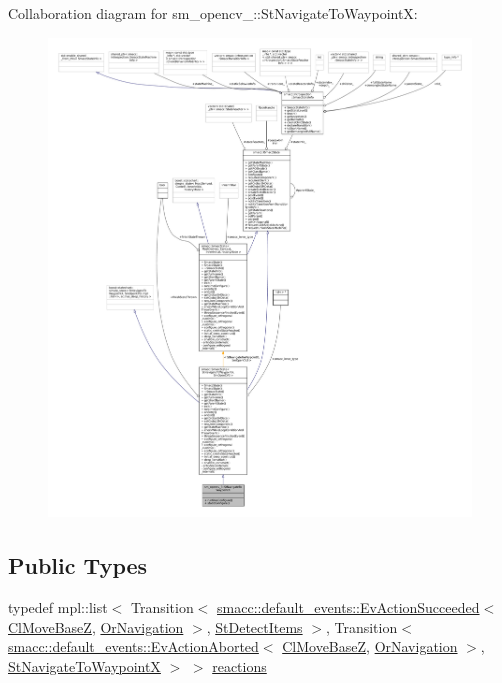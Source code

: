 Collaboration diagram for sm\+\_\+opencv\+\_\+:\+:St\+Navigate\+To\+WaypointX\+:
\nopagebreak
\begin{figure}[H]
\begin{center}
\leavevmode
\includegraphics[width=350pt]{structsm__opencv__3_1_1StNavigateToWaypointX__coll__graph}
\end{center}
\end{figure}
\subsection*{Public Types}
\begin{DoxyCompactItemize}
\item 
typedef mpl\+::list$<$ Transition$<$ \hyperlink{structsmacc_1_1default__events_1_1EvActionSucceeded}{smacc\+::default\+\_\+events\+::\+Ev\+Action\+Succeeded}$<$ \hyperlink{classcl__move__base__z_1_1ClMoveBaseZ}{Cl\+Move\+BaseZ}, \hyperlink{classsm__opencv__3_1_1OrNavigation}{Or\+Navigation} $>$, \hyperlink{structsm__opencv__3_1_1StDetectItems}{St\+Detect\+Items} $>$, Transition$<$ \hyperlink{structsmacc_1_1default__events_1_1EvActionAborted}{smacc\+::default\+\_\+events\+::\+Ev\+Action\+Aborted}$<$ \hyperlink{classcl__move__base__z_1_1ClMoveBaseZ}{Cl\+Move\+BaseZ}, \hyperlink{classsm__opencv__3_1_1OrNavigation}{Or\+Navigation} $>$, \hyperlink{structsm__opencv__3_1_1StNavigateToWaypointX}{St\+Navigate\+To\+WaypointX} $>$ $>$ \hyperlink{structsm__opencv__3_1_1StNavigateToWaypointX_add68d576435c530956013e5fb88dc0e3}{reactions}
\end{DoxyCompactItemize}
